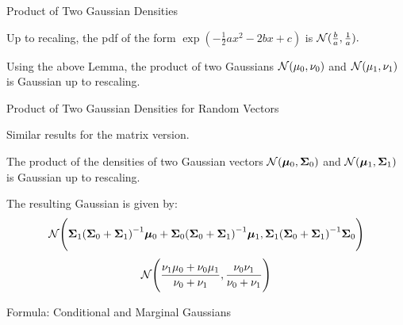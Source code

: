 \documentclass[handout,fleqn,aspectratio=169]{beamer}
\begin{document}
\begin{frame}{Product of Two Gaussian Densities}

\plitemsep 0.1in
\bci 
\item {} Up to recaling, the pdf of the form $\exp(-\frac{1}{2} ax^2 -2bx +c)$ is $\mathcal N(\frac{b}{a},\frac{1}{a}).$  

\medskip
\item Using the above Lemma, the product of two Gaussians $\mathcal N(\mu_0,\nu_0)$ and $\mathcal N(\mu_1,\nu_1)$ is Gaussian up to rescaling. 

\medskip
{}

\eci
\end{frame}

\begin{frame}{Product of Two Gaussian Densities for Random Vectors}

\plitemsep 0.1in
\bci 
\item Similar results for the matrix version.

\item The product of the densities of two Gaussian vectors $\mathcal N(\bm{\mu}_0,\bm{\Sigma}_0)$ and $\mathcal N(\bm{\mu}_1,\bm{\Sigma}_1)$ is Gaussian up to rescaling. 

\item The resulting Gaussian is given by:
$$
\mathcal N\Bigg(\bm{\Sigma}_1 {{(\bm{\Sigma}_0 + \bm{\Sigma}_1)}^{-1}} \bm{\mu}_0 + \bm{\Sigma}_0{{(\bm{\Sigma}_0 + \bm{\Sigma}_1)}^{-1}}\bm{\mu}_1,
\bm{\Sigma}_1{{(\bm{\Sigma}_0 + \bm{\Sigma}_1)}^{-1}}\bm{\Sigma}_0
\Bigg)
$$
$$
\mathcal N\Bigg(\frac{\nu_1\mu_0 + \nu_0\mu_1}{\nu_0 + \nu_1}, \frac{\nu_0\nu_1}{\nu_0+\nu_1} \Bigg)
$$
\eci
\end{frame}

\begin{frame}{Formula: Conditional and Marginal Gaussians}


\end{frame}
\end{document}
